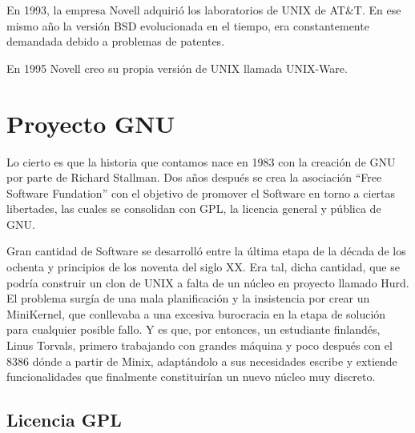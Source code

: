 En 1993, la empresa Novell adquirió los laboratorios de UNIX de AT\&T. En ese
mismo año la versión BSD evolucionada en el tiempo, era constantemente demandada
debido a problemas de patentes.


En 1995 Novell creo su propia versión de UNIX llamada UNIX-Ware. 





\section{Proyecto GNU}

Lo cierto es que la historia que contamos nace en 1983 con la creaci\'on de
GNU
\cite{Stallman:1985:GM} por
parte de Richard Stallman\endnote{}.
Dos a\~{n}os despu\'es se crea la
asociaci\'on ``Free Software
Fundation'' con el
objetivo de promover el Software en torno a ciertas libertades, las cuales se
consolidan con
GPL, la licencia general y
p\'ublica de GNU.


Gran cantidad de Software se desarroll\'o entre la \'ultima etapa de la d\'ecada
de los ochenta y principios de los noventa del siglo XX. Era tal, dicha
cantidad, que se podr\'ia construir un clon de UNIX a falta de un n\'ucleo en
proyecto llamado
Hurd. El problema surg\'ia de una mala
planificaci\'on y la
insistencia por crear un MiniKernel, que conllevaba a una
excesiva burocracia en la etapa de soluci\'on para cualquier posible fallo. Y es
que, por entonces, un estudiante finland\'es, Linus
Torvals\endnote{}, primero
trabajando
con grandes m\'aquina y poco despu\'es con el 8386 d\'onde a partir
de Minix,
adapt\'andolo a sus necesidades escribe y extiende funcionalidades que
finalmente constituir\'ian un nuevo n\'ucleo muy discreto.

\subsection{Licencia GPL}

